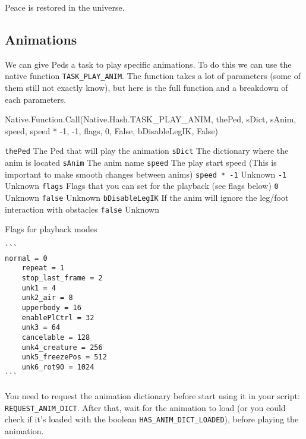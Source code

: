 \documentclass[
  openany]{book}
\newenvironment{Shaded}{\begin{snugshade}}{\end{snugshade}}
\newcommand{\DecValTok}[1]{\textcolor[rgb]{0.00,0.00,0.81}{#1}}
\newcommand{\FunctionTok}[1]{\textcolor[rgb]{0.00,0.00,0.00}{#1}}
\newcommand{\NormalTok}[1]{#1}
\begin{document}
Peace is restored in the universe.

\hypertarget{animations}{%
\subsection*{Animations}\label{animations}}

We can give Peds a task to play specific animations. To do this we can use the native function \texttt{TASK\_PLAY\_ANIM}.
The function takes a lot of parameters (some of them still not exactly know), but here is the full function and a breakdown of each parameters.

\begin{Shaded}
\begin{Highlighting}[]
\NormalTok{Native.}\FunctionTok{Function}\NormalTok{.}\FunctionTok{Call}\NormalTok{(Native.}\FunctionTok{Hash}\NormalTok{.}\FunctionTok{TASK_PLAY_ANIM}\NormalTok{, thePed, sDict, sAnim, speed, speed * }\DecValTok{-1}\NormalTok{, }\DecValTok{-1}\NormalTok{, flags, }\DecValTok{0}\NormalTok{, False, bDisableLegIK, False) }
\end{Highlighting}
\end{Shaded}

\texttt{thePed} The Ped that will play the animation
\texttt{sDict} The dictionary where the anim is located
\texttt{sAnim} The anim name
\texttt{speed} The play start speed (This is important to make smooth changes between anims)
\texttt{speed\ *\ -1} Unknown
\texttt{-1} Unknown
\texttt{flags} Flags that you can set for the playback (see flags below)
\texttt{0} Unknown
\texttt{false} Unknown
\texttt{bDisableLegIK} If the anim will ignore the leg/foot interaction with obstacles
\texttt{false} Unknown

Flags for playback modes

\begin{verbatim}
```
normal = 0
    repeat = 1
    stop_last_frame = 2
    unk1 = 4
    unk2_air = 8
    upperbody = 16
    enablePlCtrl = 32
    unk3 = 64
    cancelable = 128
    unk4_creature = 256
    unk5_freezePos = 512
    unk6_rot90 = 1024
```
\end{verbatim}

You need to request the animation dictionary before start using it in your script: \texttt{REQUEST\_ANIM\_DICT}.
After that, wait for the animation to load (or you could check if it's loaded with the boolean \texttt{HAS\_ANIM\_DICT\_LOADED}), before playing the animation.
\end{document}
